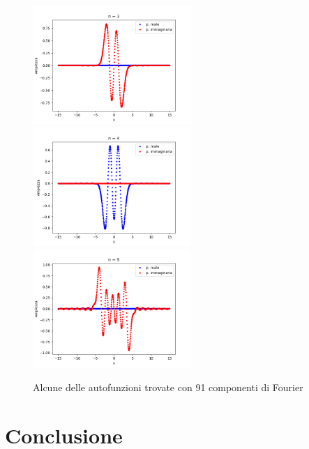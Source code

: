 \documentclass[a4paper,11pt]{article}
\begin{document}
\begin{figure}[h!]
{\begin{minipage}{18cm}
\includegraphics[width=6cm]{auto_B 3.png}  \includegraphics[width=6cm]{auto_B 4.png} \includegraphics[width=6cm]{auto_B 9.png}
\end{minipage}
}
\caption{Alcune delle autofunzioni trovate con 91 componenti di Fourier}
\end{figure}

\section*{Conclusione}
\end{document}
